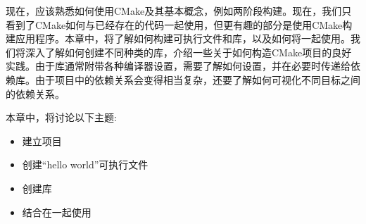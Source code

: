 现在，应该熟悉如何使用CMake及其基本概念，例如两阶段构建。现在，我们只看到了CMake如何与已经存在的代码一起使用，但更有趣的部分是使用CMake构建应用程序。本章中，将了解如何构建可执行文件和库，以及如何将一起使用。我们将深入了解如何创建不同种类的库，介绍一些关于如何构造CMake项目的良好实践。由于库通常附带各种编译器设置，需要了解如何设置，并在必要时传递给依赖库。由于项目中的依赖关系会变得相当复杂，还要了解如何可视化不同目标之间的依赖关系。

本章中，将讨论以下主题:

\begin{itemize}
\item 
建立项目

\item 
创建“hello world”可执行文件

\item 
创建库

\item 
结合在一起使用
\end{itemize}